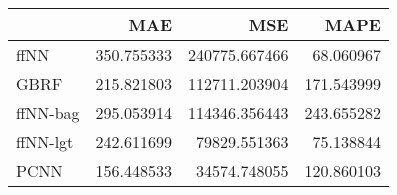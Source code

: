 \begin{tabular}{lrrr}
\toprule
{} &         MAE &            MSE &        MAPE \\
\midrule
ffNN     &  350.755333 &  240775.667466 &   68.060967 \\
GBRF     &  215.821803 &  112711.203904 &  171.543999 \\
ffNN-bag &  295.053914 &  114346.356443 &  243.655282 \\
ffNN-lgt &  242.611699 &   79829.551363 &   75.138844 \\
PCNN     &  156.448533 &   34574.748055 &  120.860103 \\
\bottomrule
\end{tabular}
